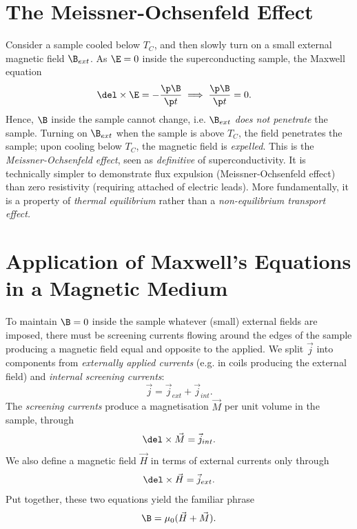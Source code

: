 \documentclass[a4paper, 11pt, normalem]{report}
\begin{document}
\section{The Meissner-Ochsenfeld Effect}
Consider a sample cooled below $T_C$, and then slowly turn on a small external magnetic field $\B_{ext}$.
As $\E=0$ inside the superconducting sample, the Maxwell equation
\begin{align}
    \del\times\E &= -\frac{\p\B}{\p t} \implies \frac{\p\B}{\p t}=0.
\end{align}
Hence, $\B$ inside the sample cannot change, i.e. $\B_{ext}$ \emph{does not penetrate} the sample.
Turning on $\B_{ext}$ when the sample is above $T_C$, the field penetrates the sample; upon cooling below $T_C$, the magnetic field is \emph{expelled}.
This is the \emph{Meissner-Ochsenfeld effect}, seen as \emph{definitive} of superconductivity.
It is technically simpler to demonstrate flux expulsion (Meissner-Ochsenfeld effect) than zero resistivity (requiring attached of electric leads).
More fundamentally, it is a property of \emph{thermal equilibrium} rather than a \emph{non-equilibrium transport effect.}

\section{Application of Maxwell's Equations in a Magnetic Medium}
To maintain $\B=0$ inside the sample whatever (small) external fields are imposed, there must be screening currents flowing around the edges of the sample producing a magnetic field equal and opposite to the applied.
We split $\vec{j}$ into components from \emph{externally applied currents} (e.g. in coils producing the external field) and \emph{internal screening currents}:
\begin{equation}
    \vec{j}=\vec{j}_{ext}+\vec{j}_{int}.
\end{equation}
The \emph{screening currents} produce a magnetisation $\vec{M}$ per unit volume in the sample, through
\begin{equation}
    \del\times\vec{M}=\vec{j}_{int}.
\end{equation}
We also define a magnetic field $\vec{H}$ in terms of external currents only through
\begin{equation}
    \del\times\vec{H}=\vec{j}_{ext}.
\end{equation}
Put together, these two equations yield the familiar phrase
\begin{equation}
    \B = \mu_0(\vec{H}+\vec{M}).
\end{equation}
\end{document}
